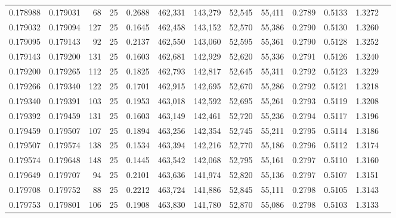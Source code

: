 \begin{tabular}{rrrrrrrrrrrrr}
0.178988 & 0.179031 &    68 &  25 &                                     0.2688 & 462,331 & 143,279 &  52,545 &  55,411 & 0.2789 & 0.5133 & 1.3272 \\
0.179032 & 0.179094 &   127 &  25 &                                     0.1645 & 462,458 & 143,152 &  52,570 &  55,386 & 0.2790 & 0.5130 & 1.3260 \\
0.179095 & 0.179143 &    92 &  25 &                                     0.2137 & 462,550 & 143,060 &  52,595 &  55,361 & 0.2790 & 0.5128 & 1.3252 \\
0.179143 & 0.179200 &   131 &  25 &                                     0.1603 & 462,681 & 142,929 &  52,620 &  55,336 & 0.2791 & 0.5126 & 1.3240 \\
0.179200 & 0.179265 &   112 &  25 &                                     0.1825 & 462,793 & 142,817 &  52,645 &  55,311 & 0.2792 & 0.5123 & 1.3229 \\
0.179266 & 0.179340 &   122 &  25 &                                     0.1701 & 462,915 & 142,695 &  52,670 &  55,286 & 0.2792 & 0.5121 & 1.3218 \\
0.179340 & 0.179391 &   103 &  25 &                                     0.1953 & 463,018 & 142,592 &  52,695 &  55,261 & 0.2793 & 0.5119 & 1.3208 \\
0.179392 & 0.179459 &   131 &  25 &                                     0.1603 & 463,149 & 142,461 &  52,720 &  55,236 & 0.2794 & 0.5117 & 1.3196 \\
0.179459 & 0.179507 &   107 &  25 &                                     0.1894 & 463,256 & 142,354 &  52,745 &  55,211 & 0.2795 & 0.5114 & 1.3186 \\
0.179507 & 0.179574 &   138 &  25 &                                     0.1534 & 463,394 & 142,216 &  52,770 &  55,186 & 0.2796 & 0.5112 & 1.3174 \\
0.179574 & 0.179648 &   148 &  25 &                                     0.1445 & 463,542 & 142,068 &  52,795 &  55,161 & 0.2797 & 0.5110 & 1.3160 \\
0.179649 & 0.179707 &    94 &  25 &                                     0.2101 & 463,636 & 141,974 &  52,820 &  55,136 & 0.2797 & 0.5107 & 1.3151 \\
0.179708 & 0.179752 &    88 &  25 &                                     0.2212 & 463,724 & 141,886 &  52,845 &  55,111 & 0.2798 & 0.5105 & 1.3143 \\
0.179753 & 0.179801 &   106 &  25 &                                     0.1908 & 463,830 & 141,780 &  52,870 &  55,086 & 0.2798 & 0.5103 & 1.3133 \\

\end{tabular}
